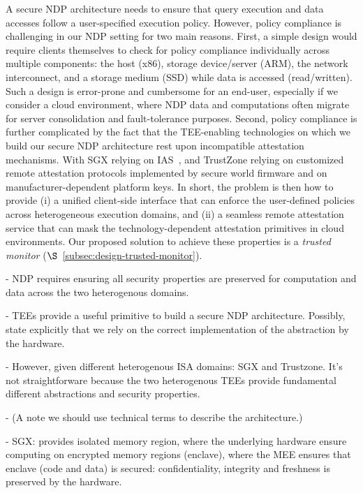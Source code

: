 A secure NDP architecture needs to ensure that query execution and data accesses follow a user-specified execution policy. However, policy compliance is challenging in our NDP setting for two main reasons. First, a simple design would require clients themselves to check for policy compliance individually across multiple components: the host (x86), storage device/server (ARM), the network interconnect, and a storage medium (SSD) while data is accessed (read/written). Such a design is error-prone and cumbersome for an end-user, especially if we consider a cloud environment, where NDP data and computations often migrate for server consolidation and fault-tolerance purposes. Second, policy compliance is further complicated by the fact that the TEE-enabling technologies on which we build our secure NDP architecture rest upon incompatible attestation mechanisms. With SGX relying on IAS~\cite{ias, ananti-hasp-2013}, and TrustZone relying on customized remote attestation protocols implemented by secure world firmware and on manufacturer-dependent platform keys. In short, the problem is then how to provide (i) a unified client-side interface that can enforce the user-defined policies across heterogeneous execution domains, and (ii) a seamless remote attestation service that can mask the technology-dependent attestation primitives in cloud environments. Our proposed solution to achieve these properties is a \textit{trusted monitor} ($\S$~\ref{subsec:design-trusted-monitor}).




- NDP requires ensuring all security properties are preserved for computation and data across the two heterogenous domains.


- TEEs provide a useful primitive to build a secure NDP architecture. Possibly, state explicitly that we rely on the correct implementation of the abstraction by the hardware.

- However, given different heterogenous ISA domains: SGX and Trustzone. It's not straightforware because the two heterogenous TEEs provide fundamental different abstractions and security properties. 

- (A note we should use technical terms to describe the architecture.)
 
- SGX: provides isolated memory region, where the underlying hardware ensure computing on encrypted memory regions (enclave), where the MEE ensures that enclave (code and data) is secured: confidentiality, integrity and freshness is preserved by the hardware.

